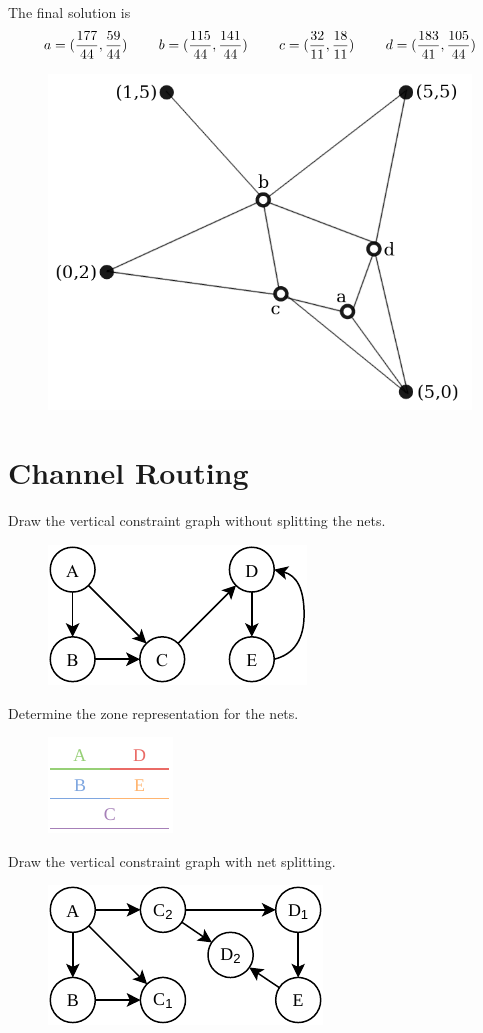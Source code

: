 \documentclass[a4paper, 10pt]{article}
\begin{document}
The final solution is
\[
    a = (\frac{177}{44},\frac{59}{44})\hspace{8mm}b = (\frac{115}{44},\frac{141}{44})\hspace{8mm}c = (\frac{32}{11},\frac{18}{11})\hspace{8mm}d = (\frac{183}{41},\frac{105}{44})    
\]

\begin{figure}[htbp]
    \centering
    \includegraphics[width=0.5\linewidth]{1_qplacement.png}
\end{figure}
\newpage
\section{Channel Routing}
{\color{statement} Draw the vertical constraint graph without splitting the nets.}
\begin{figure}[htbp]
    \centering
    \includegraphics[width=0.3\linewidth]{2_vcg.pdf}
\end{figure}


{\color{statement} Determine the zone representation for the nets.}

\begin{figure}[htbp]
    \centering
    \includegraphics[width=0.2\linewidth]{2_zr.pdf}
\end{figure}

{\color{statement} Draw the vertical constraint graph with net splitting.}

\begin{figure}[htbp]
    \centering
    \includegraphics[width=0.3\linewidth]{2_vcg_split.pdf}
\end{figure}
\end{document}
